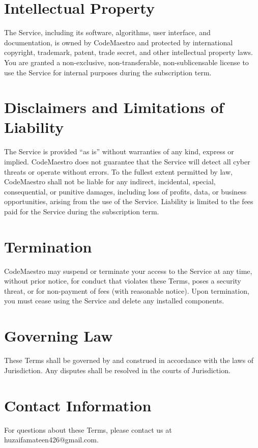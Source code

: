 \documentclass[12pt]{article}
\begin{document}
\section*{Intellectual Property}
The Service, including its software, algorithms, user interface, and documentation, is owned by CodeMaestro and protected by international copyright, trademark, patent, trade secret, and other intellectual property laws. You are granted a non-exclusive, non-transferable, non-sublicensable license to use the Service for internal purposes during the subscription term.

\section*{Disclaimers and Limitations of Liability}
The Service is provided ``as is'' without warranties of any kind, express or implied. CodeMaestro does not guarantee that the Service will detect all cyber threats or operate without errors. To the fullest extent permitted by law, CodeMaestro shall not be liable for any indirect, incidental, special, consequential, or punitive damages, including loss of profits, data, or business opportunities, arising from the use of the Service. Liability is limited to the fees paid for the Service during the subscription term.

\section*{Termination}
CodeMaestro may suspend or terminate your access to the Service at any time, without prior notice, for conduct that violates these Terms, poses a security threat, or for non-payment of fees (with reasonable notice). Upon termination, you must cease using the Service and delete any installed components.

\section*{Governing Law}
These Terms shall be governed by and construed in accordance with the laws of Jurisdiction. Any disputes shall be resolved in the courts of Jurisdiction.

\section*{Contact Information}
For questions about these Terms, please contact us at huzaifamateen426@gmail.com.
\end{document}
